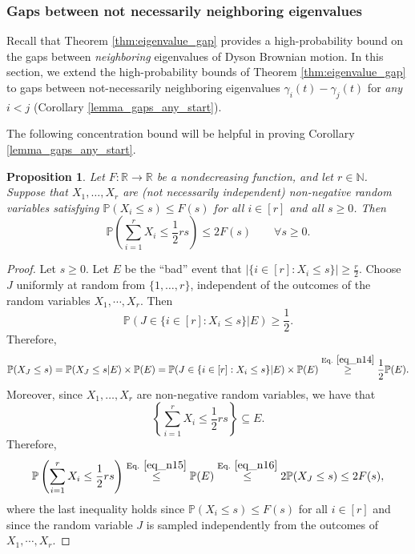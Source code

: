 \documentclass[11pt,letterpaper]{article}
\newtheorem{proposition}[theorem]{Proposition}
\begin{document}
\subsubsection{Gaps between not necessarily neighboring eigenvalues} \label{section_non_neighboring_gaps}

%
Recall that Theorem \ref{thm:eigenvalue_gap} provides a high-probability bound on the gaps between {\em neighboring} eigenvalues of Dyson Brownian motion.
%
In this section, we extend the high-probability bounds of Theorem \ref{thm:eigenvalue_gap} to gaps between not-necessarily neighboring eigenvalues $\gamma_i(t) - \gamma_j(t)$  for {\em any} $i<j$ (Corollary \ref{lemma_gaps_any_start}).

The following concentration bound will be helpful in proving Corollary \ref{lemma_gaps_any_start}.
%
\begin{proposition}\label{prop_sum_nonindependent}
Let $F: \mathbb{R} \rightarrow \mathbb{R}$ be a nondecreasing function, and let $r \in \mathbb{N}$.
%
 Suppose that $X_1, \ldots, X_r$  are (not necessarily independent) non-negative random variables satisfying $\mathbb{P}(X_i \leq s) \leq F(s)$ for all $i \in [r]$ and all $s \geq 0$.
%
Then
%
\begin{equation} \label{eq_sum_nonindependent}
    \mathbb{P}\left(\sum_{i=1}^r X_i \leq \frac{1}{2}rs\right) \leq 2F(s) \qquad \forall s \geq 0. 
\end{equation}
\end{proposition}

\begin{proof}
%
Let $s \geq 0$. 
%
 Let $E$ be the ``bad'' event that $|\{i \in [r]: X_i \leq s\}| \geq \frac{r}{2}$.
%
%
Choose $J$ uniformly at random from $\{1,\ldots, r\}$, independent of the outcomes of the random variables $X_1,\cdots, X_r$.
%
Then
%
\begin{equation}\label{eq_n14}
\mathbb{P}(J \in \{i \in [r]: X_i \leq s\} | E) \geq \frac{1}{2}.
\end{equation}
%
Therefore,
%
\begin{align}\label{eq_n16}
    \mathbb{P}(X_J \leq s) =  \mathbb{P}(X_J \leq s| E) \times \mathbb{P}(E) = \mathbb{P}(J \in \{i \in [r]: X_i \leq s\} | E)  \times \mathbb{P}(E) \stackrel{\textrm{Eq. } \eqref{eq_n14}}{\geq} \frac{1}{2} \mathbb{P}(E).
\end{align}
%
%
%
Moreover, since $X_1,\ldots, X_r$ are non-negative random variables, we have that 
%
\begin{equation}\label{eq_n15}
   \left \{\sum_{i=1}^r X_i \leq \frac{1}{2}rs\right\} \subseteq E.
\end{equation}
%
Therefore,
%
\begin{equation*}
      \mathbb{P}\left(\sum_{i=1}^r X_i \leq \frac{1}{2}rs\right) \stackrel{\textrm{Eq. } \eqref{eq_n15}}{\leq}  \mathbb{P}(E) \stackrel{\textrm{Eq. } \eqref{eq_n16}}{\leq}  2  \mathbb{P}(X_J \leq s) \leq 2F(s),
\end{equation*}
%
where the last inequality holds since $\mathbb{P}(X_i \leq s) \leq F(s)$  for all $i \in [r]$ and since the random variable $J$ is sampled independently from the outcomes of $X_1,\cdots, X_r$.
\end{proof}
\end{document}

